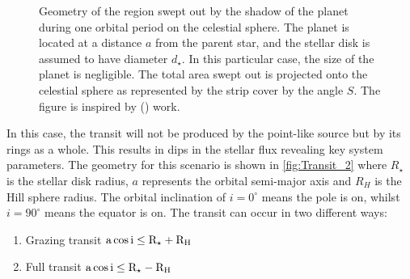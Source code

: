 \begin{figure}[!ht]
\centering
\caption{\scriptsize{Geometry of the region swept out by the shadow of the planet during one orbital period on the celestial sphere. The planet is located at a distance $a$ from the parent star, and the stellar disk is assumed to have diameter $d_\star$}. In this particular case, the size of the planet is negligible. The total area swept out is projected onto the celestial sphere as represented by the strip cover by the angle $S$. The figure is inspired by  (\citeyear{1984Icar...58..121B}) work.}
\label{fig:Transit_1}
\end{figure}

In this case, the transit will not be produced by the point-like source but by its rings as a whole. This results in dips in the stellar flux revealing key system parameters. The geometry for this scenario is shown in \autoref{fig:Transit_2} where $R_\star$ is the stellar disk radius, $a$ represents the orbital semi-major axis and $R_H$ is the Hill sphere radius. The orbital inclination of $i = 0^\circ$ means the pole is on, whilst $i = 90^\circ$ means the equator is on. The transit can occur in two different ways:\\

\begin{enumerate}
\item Grazing transit $\textnormal{a} \cos \textnormal{i} \leq \textnormal{R}_\star + \textnormal{R}_\textnormal{H}$
\item Full transit $\textnormal{a} \cos \textnormal{i} \leq \textnormal{R}_\star - \textnormal{R}_\textnormal{H}$
\end{enumerate}

